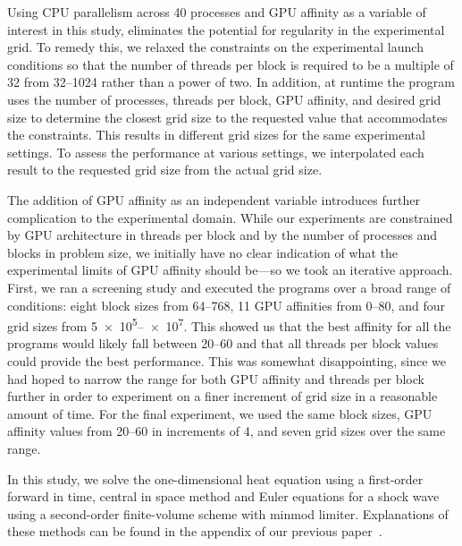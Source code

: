 Using CPU parallelism across 40 processes and GPU affinity as a variable of interest in this study, eliminates the potential for regularity in the experimental grid.
To remedy this, we relaxed the constraints on the experimental launch conditions so that the number of
threads per block is required to be a multiple of 32 from \numrange{32}{1024} rather than a power of two.
In addition, at runtime the program uses the number of processes, threads per block, GPU affinity,
and desired grid size to determine the closest grid size to the requested value that accommodates the constraints.
This results in different grid sizes for the same experimental settings.
To assess the performance at various settings, we interpolated each result to the requested grid size
from the actual grid size.

The addition of GPU affinity as an independent variable introduces further complication to the experimental domain.
While our experiments are constrained by GPU architecture in threads per block and by the number
of processes and blocks in problem size, we initially have no clear indication of what the
experimental limits of GPU affinity should be---so we took an iterative approach.
First, we ran a screening study and executed the programs over a broad range of conditions:
eight block sizes from \numrange{64}{768}, 11 GPU affinities from \numrange{0}{80}, and
four grid sizes from \numrange{5e5}{e7}.
This showed us that the best affinity for all the programs would likely fall between \numrange{20}{60}
and that all threads per block values could provide the best performance.
This was somewhat disappointing, since we had hoped to narrow the range for both GPU affinity and
threads per block further in order to experiment on a finer increment of grid size in a reasonable amount of time.
For the final experiment, we used the same block sizes, GPU affinity values from \numrange{20}{60}
in increments of 4, and seven grid sizes over the same range.

In this study, we solve the one-dimensional heat equation using a first-order forward in time, central in space
method and Euler equations for a shock wave using a second-order finite-volume scheme with minmod limiter.
Explanations of these methods can be found in the appendix of our previous paper~\cite{OurJCP}.
